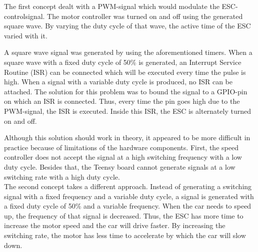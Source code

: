 \documentclass[conference,a4paper]{IEEEtran}
\begin{document}
\noindent The first concept dealt with a PWM-signal which would modulate the ESC-controlsignal. The motor controller was turned on and off using the generated square wave. By varying the duty cycle of that wave, the active time of the ESC varied with it.

A square wave signal was generated by using the aforementioned timers. When a square wave with a fixed duty cycle of 50\% is generated, an Interrupt Service Routine (ISR) can be connected which will be executed every time the pulse is high. When a signal with a variable duty cycle is produced, no ISR can be attached. The solution for this problem was to bound the signal to a GPIO-pin on which an ISR is connected. Thus, every time the pin goes high due to the PWM-signal, the ISR is executed. Inside this ISR, the ESC is alternately turned on and off.

Although this solution should work in theory, it appeared to be more difficult in practice because of limitations of the hardware components. First, the speed controller does not accept the signal at a high switching frequency with a low duty cycle. Besides that, the Teensy board cannot generate signals at a low switching rate with a high duty cycle. \\


\noindent The second concept takes a different approach. Instead of generating a switching signal with a fixed frequency and a variable duty cycle, a signal is generated with a fixed duty cycle of 50\% and a variable frequency. When the car needs to speed up, the frequency of that signal is decreased. Thus, the ESC has more time to increase the motor speed and the car will drive faster. By increasing the switching rate, the motor has less time to accelerate by which the car will slow down.
\end{document}
